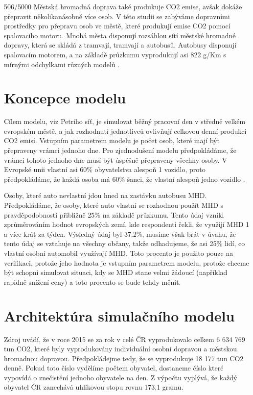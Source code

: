 \documentclass[a4paper, 11pt]{article}
\begin{document}
506/5000
Městská hromadná doprava také produkuje CO2 emise, avšak dokáže přepravit několikanásobně více osob. V této studii se zabýváme dopravními prostředky pro přepravu osob ve městě, které produkují emise CO2 pomocí spalovacího motoru. Mnohá města disponují rozsáhlou sítí městské hromadné dopravy, která se skládá z tramvají, tramvají a autobusů. Autobusy disponují spalovacím motorem, a na základě průzkumu vyprodukují asi 822 g/Km s mírnými odchylkami různých modelů \cite {bust_travel}.



\section{Koncepce modelu}

Cílem modelu, viz Petriho síť, je simulovat běžný pracovní den v středně velkém evropském městě, a jak rozhodnutí jednotlivců ovlivňují celkovou denní produkci CO2 emisí. Vstupním parametrem modelu je počet osob, které mají být přepraveny vrámci jednoho dne. Pro zjednodušení modelu předpokládáme, že vrámci tohoto jednoho dne musí být úspěšně přepraveny všechny osoby. V Evropské unii vlastní asi 60\% obyvatelstva alespoň 1 vozidlo, proto předpokládáme, že každá osoba má 60\% šanci, že vlastní alespoň jedno vozidlo \cite {rss}. 

Osoby, které auto nevlastní jdou hned na zastávku autobusu MHD. Předpokládáme, že osoby, které auto vlastní se rozhodnou použít MHD s pravděpodobností přibližně 25\% na základě průzkumu. Tento údaj vznikl zprůměrováním hodnot evropských zemí, kde respondenti řekli, že využijí MHD 1 a více krát za týden. Výsledný údaj byl 37.2\%, musíme však brát v úvahu, že tento údaj se vztahuje na všechny občany, takže odhadujeme, že asi 25\% lidí, co vlastní osobní automobil využívají MHD. Toto procento je použito pouze na verifikaci, protože jeho hodnota je vstupním parametrem modelu, protože chceme být schopni simulovat situaci, kdy se MHD stane velmi žádoucí (například rapidně snížení ceny) a toto procento se bude tehdy měnit.



\section{Architektúra simulačního modelu}
Zdroj uvádí, že v roce 2015 se za rok v celé ČR vyprodukovalo celkem 6 634 769 tun CO2, které byly vyprodukovány individuální osobní dopravou a městskou hromadnou dopravou. Předpokládejme tedy, že se vyprodukuje 18 177 tun CO2 denně. Pokud toto číslo vydělíme počtem obyvatel, dostaneme číslo které vypovídá o znečistění jednoho obyvatele na den. Z výpočtu vyplývá, že každý obyvatel ČR zanechává uhlíkovou stopu rovnu 173,1 gramu. 
\end{document}
